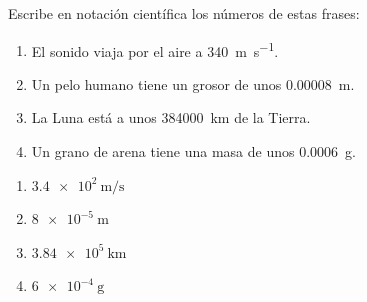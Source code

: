 \begin{exercise}
    Escribe en notación científica los números de estas frases:
    \begin{enumerate}[label=\letraminuscula]
        \item El sonido viaja por el aire a \qty{340}{\m\per\s}.
        \item Un pelo humano tiene un grosor de unos \qty{0.00008}{\m}.
        \item La Luna está a unos \qty{384000}{\km} de la Tierra.
        \item Un grano de arena tiene una masa de unos \qty{0.0006}{\g}.
    \end{enumerate}

    \begin{solu}
        \begin{enumerate}[label=\alph*)]
            \item \(\qty{3.4e2}{\m\per\s}\)
            \item \(\qty{8e-5}{\m}\)
            \item \(\qty{3.84e5}{\km}\)
            \item \(\qty{6e-4}{\g}\)
        \end{enumerate}
    \end{solu}
\end{exercise}

